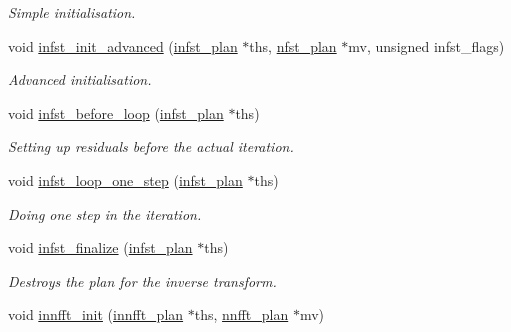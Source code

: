 \begin{CompactItemize}
\begin{CompactList}\small\item\em Simple initialisation. \item\end{CompactList}\item 
\hypertarget{group__solver_ga11}{
void \hyperlink{group__solver_ga11}{infst\_\-init\_\-advanced} (\hyperlink{structinfst__plan}{infst\_\-plan} $\ast$ths, \hyperlink{structnfst__plan}{nfst\_\-plan} $\ast$mv, unsigned infst\_\-flags)}
\label{group__solver_ga11}

\begin{CompactList}\small\item\em Advanced initialisation. \item\end{CompactList}\item 
\hypertarget{group__solver_ga12}{
void \hyperlink{group__solver_ga12}{infst\_\-before\_\-loop} (\hyperlink{structinfst__plan}{infst\_\-plan} $\ast$ths)}
\label{group__solver_ga12}

\begin{CompactList}\small\item\em Setting up residuals before the actual iteration. \item\end{CompactList}\item 
\hypertarget{group__solver_ga13}{
void \hyperlink{group__solver_ga13}{infst\_\-loop\_\-one\_\-step} (\hyperlink{structinfst__plan}{infst\_\-plan} $\ast$ths)}
\label{group__solver_ga13}

\begin{CompactList}\small\item\em Doing one step in the iteration. \item\end{CompactList}\item 
\hypertarget{group__solver_ga14}{
void \hyperlink{group__solver_ga14}{infst\_\-finalize} (\hyperlink{structinfst__plan}{infst\_\-plan} $\ast$ths)}
\label{group__solver_ga14}

\begin{CompactList}\small\item\em Destroys the plan for the inverse transform. \item\end{CompactList}\item 
\hypertarget{group__solver_ga15}{
void \hyperlink{group__solver_ga15}{innfft\_\-init} (\hyperlink{structinnfft__plan}{innfft\_\-plan} $\ast$ths, \hyperlink{structnnfft__plan}{nnfft\_\-plan} $\ast$mv)}
\label{group__solver_ga15}


\end{CompactItemize}
